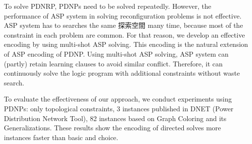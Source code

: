 \documentclass[dvipdfmx,a4paper]{jsarticle}
\begin{document}

To solve PDNRP, PDNPs need to be solved repeatedly.
%
However, the performance of ASP system in solving 
reconfiguration problems is not effective.
%
ASP system has to searches the same 探索空間 many time,
because most of the constraint in each problem are common.
%
For that reason, we develop an effective encoding by using multi-shot 
ASP solving.
%
This encoding is the natural extension of ASP encoding of PDNP.
%
Using multi-shot ASP solving, ASP system can (partly) retain learning
clauses to avoid similar conflict.
%
Therefore, it can continuously solve the logic program with additional
constraints without waste search.


To evaluate the effectiveness of our approach, we conduct experiments
using PDNPs: only topological constraints, 3 instances published in DNET 
(Power Distribution Network Tool), 82 instances based on
Graph Coloring and its Generalizations.
%
These results show the encoding of \textsf{directed} solves more instances
faster than \textsf{basic} and \textsf{choice}.

\end{document}

